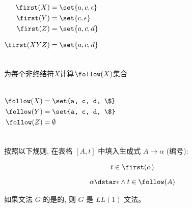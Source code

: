 \begin{frame}{}
  \begin{columns}
      
      \pause
      \begin{align*}
        \first(X) &= \set{a, c, \epsilon} \\
        \first(Y) &= \set{c, \epsilon} \\
        \first(Z) &= \set{a, c, d} \\[8pt]
        \first(XYZ) &= \set{a, c, d}
      \end{align*}
  \end{columns}
\end{frame}

\begin{frame}{}
  \begin{center}
    {\large 为每个非终结符$X$计算$\follow(X)$集合}

    

  \end{center}
\end{frame}

\begin{frame}{}
  \begin{columns}
      
      \pause
      \begin{align*}
        \follow(X) &= \set{a, c, d, \$} \\
        \follow(Y) &= \set{a, c, d, \$} \\
        \follow(Z) &= \emptyset
      \end{align*}
  \end{columns}
\end{frame}

\begin{frame}{}
  \begin{center}

    \vspace{0.80cm}
    按照以下规则, 在表格 $[A, t]$ 中填入生成式 $A \to \alpha$ (编号):

    \begin{gather}
      t \in \first(\alpha) \\[6pt]
      \alpha \dstar \epsilon \land t \in \follow(A)
    \end{gather}

    \pause
    \begin{definition}[$LL(1)$文法]
      如果文法 $G$ 的是的,
      则 $G$ 是 $LL(1)$ 文法。
    \end{definition}
  \end{center}
\end{frame}

